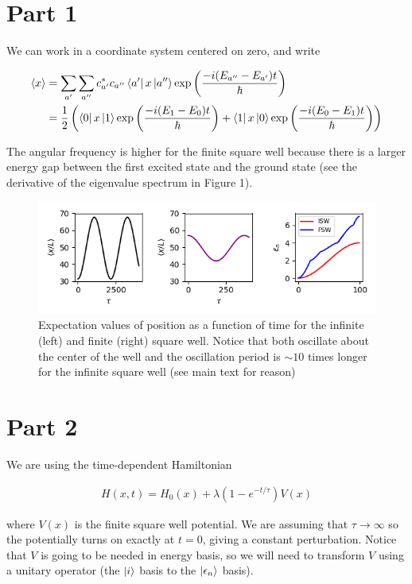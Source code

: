 \documentclass[12pt]{article}
\theoremstyle{definition}
\begin{document}
{\section{Part 1}



We can work in a coordinate system centered on zero, and write

\begin{align*}
\langle x \rangle &= \sum_{a'}\sum_{a''}c_{a'}^{*}c_{a''}\bra{a'}x\ket{a''}\exp\left(\frac{-i(E_{a''}-E_{a'})t}{\hbar}\right)\\
&= \frac{1}{2}\left(\bra{0}x\ket{1}\exp\left(\frac{-i(E_{1}-E_{0})t}{\hbar}\right) + \bra{1}x\ket{0}\exp\left(\frac{-i(E_{0}-E_{1})t}{\hbar}\right)\right)\\
\end{align*}

The angular frequency is higher for the finite square well because there is a larger energy gap between the first excited state and the ground state (see the derivative of the eigenvalue spectrum in Figure 1).

\begin{figure}
\includegraphics[scale=1]{Figure_1.png}
\centering
\caption{Expectation values of position as a function of time for the infinite (left) and finite (right) square well. Notice that both oscillate about the center of the well and the oscillation period is $\sim 10$ times longer for the infinite square well (see main text for reason)}
\end{figure}


\section{Part 2}

We are using the time-dependent Hamiltonian

\begin{align*}
H(x,t) = H_{0}(x) + \lambda(1-e^{-t/\tau})V(x)
\end{align*}

where $V(x)$ is the finite square well potential. We are assuming that $\tau\rightarrow\infty$ so the potentially turns on exactly at $t=0$, giving a constant perturbation. Notice that $V$ is going to be needed in energy basis, so we will need to transform $V$ using a unitary operator (the $\ket{i}$ basis to the $\ket{\epsilon_{n}}$ basis). 
\clearpage

}
\end{document}
